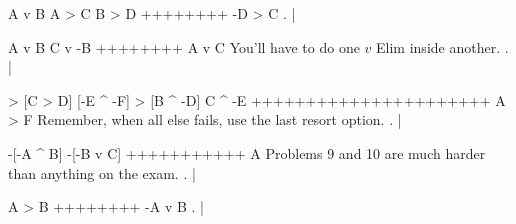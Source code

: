 \argument
 A v B
 A > C
 B > D
++++++++
 -D > C
\endargument
        \answer
        . | 
        \endfitchproof
        \endanswer

\argument
 A v B
 C v -B
++++++++
 A v C
\endargument
\Hint You'll have to do one $v$ Elim inside another.
        \answer
        . | 
        \endfitchproof
        \endanswer

\resetfitchsetup
{}
\argument
 [A ^ B] > [C > D]
 [-E ^ -F] > [B ^ -D]
 C ^ -E
++++++++++++++++++++++
 A > F
\endargument
\Hint Remember, when all else fails, use the last resort option.
        \answer
        . | 
        \endfitchproof
        \endanswer

\argument
 -[-A ^ B]
 -[-B v C]
+++++++++++
 A
\endargument
\Hint Problems 9 and 10 are much harder than anything on the exam.
        \answer
        . | 
        \endfitchproof
        \endanswer

\argument
 A > B
++++++++
 -A v B
\endargument
        \answer
        . | 
        \endfitchproof
        \endanswer

\endproblems
\bye
